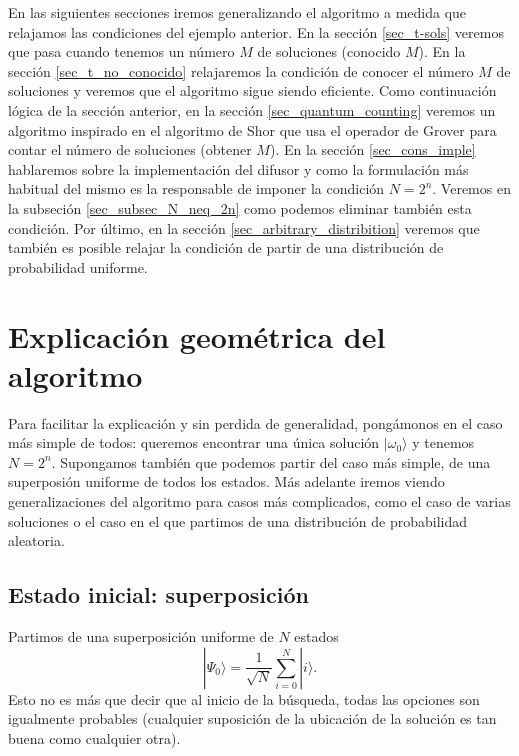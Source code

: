 \documentclass[a4paper,11pt]{book} %
\numberwithin{equation}{chapter}
\begin{document}
En las siguientes secciones iremos generalizando el algoritmo a medida que relajamos las condiciones del ejemplo anterior. En la sección \ref{sec_t-sols} veremos que pasa cuando tenemos un número $M$ de soluciones (conocido $M$). En la sección \ref{sec_t_no_conocido} relajaremos la condición de conocer el número $M$ de soluciones y veremos que el algoritmo sigue siendo eficiente. Como continuación lógica de la sección anterior, en la sección \ref{sec_quantum_counting} veremos un algoritmo inspirado en el algoritmo de Shor que usa el operador de Grover para contar el número de soluciones (obtener $M$). En la sección \ref{sec_cons_imple} hablaremos sobre la implementación del difusor y como la formulación más habitual del mismo es la responsable de imponer la condición $N=2^n$. Veremos en la subseción \ref{sec_subsec_N_neq_2n} como podemos eliminar también esta condición. Por último, en la sección \ref{sec_arbitrary_distribition} veremos que también es posible relajar la condición de partir de una distribución de probabilidad uniforme. 








\section{Explicación geométrica del algoritmo} \label{sec_geo}

Para facilitar la explicación y sin perdida de generalidad, pongámonos en el caso más simple de todos: queremos encontrar una única solución $| \omega_0 \rangle$ y tenemos $N=2^n$. Supongamos también que podemos partir del caso más simple, de una superposión uniforme de todos los estados. Más adelante iremos viendo generalizaciones del algoritmo para casos más complicados, como el caso de varias soluciones o el caso en el que partimos de una distribución de probabilidad aleatoria.

\subsection{Estado inicial: superposición}
			
Partimos de una superposición uniforme de $N$ estados 
\begin{equation} \label{ec_geo_phi-0_1}
| \Psi_0 \rangle = \frac{1}{\sqrt{N}}  \sum_{i=0}^{N} | i \rangle.
\end{equation}
Esto no es más que decir que al inicio de la búsqueda, todas las opciones son igualmente probables (cualquier suposición de la ubicación de la solución es tan buena como cualquier otra).
\end{document}
